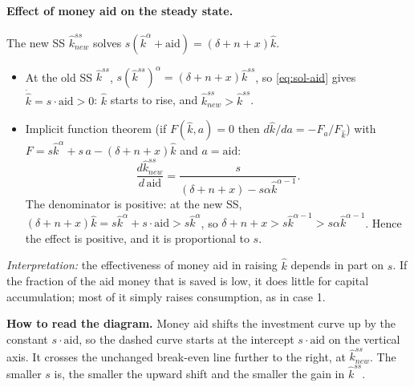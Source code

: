 \paragraph{Effect of money aid on the steady state.} The new SS $\hat k^{ss}_{new}$ solves $s(\hat k^{\alpha}+\text{aid})=(\delta+n+x)\hat k$.
\begin{itemize}
  \item At the old SS $\hat k^{ss}$, $s(\hat k^{ss})^{\alpha}=(\delta+n+x)\hat k^{ss}$, so \eqref{eq:sol-aid} gives $\dot{\hat k}=s\cdot\text{aid}>0$: $\hat k$ starts to rise, and $\hat k^{ss}_{new}>\hat k^{ss}$.
  \item Implicit function theorem (if $F(\hat k,a)=0$ then $d\hat k/da=-F_a/F_{\hat k}$) with $F=s\hat k^{\alpha}+s\,a-(\delta+n+x)\hat k$ and $a=\text{aid}$:
  \[
  \frac{d\hat k^{ss}_{new}}{d\,\text{aid}}=\frac{s}{(\delta+n+x)-s\alpha\hat k^{\alpha-1}} .
  \]
  The denominator is positive: at the new SS, $(\delta+n+x)\hat k=s\hat k^{\alpha}+s\cdot\text{aid}>s\hat k^{\alpha}$, so $\delta+n+x>s\hat k^{\alpha-1}>s\alpha\hat k^{\alpha-1}$. Hence the effect is positive, and it is proportional to $s$.
\end{itemize}
\textit{Interpretation:} the effectiveness of money aid in raising $\hat k$ depends in part on $s$. If the fraction of the aid money that is saved is low, it does little for capital accumulation; most of it simply raises consumption, as in case 1.

\begin{center}
\end{center}
\textbf{How to read the diagram.} Money aid shifts the investment curve up by the constant $s\cdot\text{aid}$, so the dashed curve starts at the intercept $s\cdot\text{aid}$ on the vertical axis. It crosses the unchanged break-even line further to the right, at $\hat k^{ss}_{new}$. The smaller $s$ is, the smaller the upward shift and the smaller the gain in $\hat k^{ss}$.

